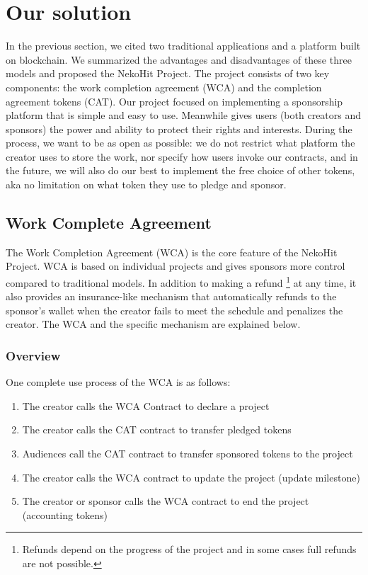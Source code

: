 \documentclass[12pt,a4paper]{article}
\begin{document}
    \section{Our solution}\label{sec:solution}

    In the previous section, we cited two traditional applications and a platform
    built on blockchain.
    We summarized the advantages and disadvantages of these three models and
    proposed the NekoHit Project.
    The project consists of two key components: the work completion agreement
    (WCA) and the completion agreement tokens (CAT).
    Our project focused on implementing a sponsorship platform that is simple and
    easy to use.
    Meanwhile gives users (both creators and sponsors) the power and ability to
    protect their rights and interests.
    During the process, we want to be as open as possible: we do not restrict
    what platform the creator uses to store the work, nor specify how users invoke
    our contracts, and in the future, we will also do our best to implement the
    free choice of other tokens, aka no limitation on what token they use to
    pledge and sponsor.

    \subsection{Work Complete Agreement}\label{subsec:wca}

    The Work Completion Agreement (WCA) is the core feature of the NekoHit Project.
    WCA is based on individual projects and gives sponsors more control compared
    to traditional models.
    In addition to making a refund \footnote{
        Refunds depend on the progress of the project and
        in some cases full refunds are not possible.
    } at any time, it also provides an insurance-like
    mechanism that automatically refunds to the sponsor's wallet when the creator
    fails to meet the schedule and penalizes the creator.
    The WCA and the specific mechanism are explained below.

    \subsubsection{Overview}

    One complete use process of the WCA is as follows:

    \begin{enumerate}
        \item The creator calls the WCA Contract to declare a project
        \item The creator calls the CAT contract to transfer pledged tokens
        \item Audiences call the CAT contract to transfer sponsored tokens to the
        project\label{item:purchase_wca}
        \item The creator calls the WCA contract to update the project (update
        milestone)\label{item:update_milestone}
        \item The creator or sponsor calls the WCA contract to end the project
        (accounting tokens)\label{item:finish_project}
    \end{enumerate}
\end{document}
